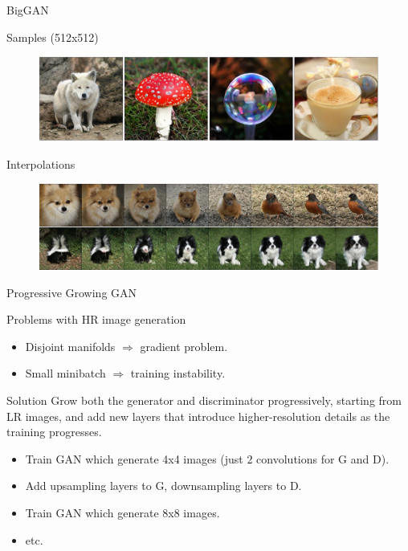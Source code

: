 \begin{frame}{BigGAN}
	\begin{block}{Samples (512x512)}
		\begin{figure}
			\centering
			\includegraphics[width=\linewidth]{figs/biggan_samples}
		\end{figure}
	\end{block}
	\vspace{-0.4cm}
	\begin{block}{Interpolations}
		\begin{figure}
			\centering
			\includegraphics[width=\linewidth]{figs/biggan_interpolations}
		\end{figure}
	\end{block}
\end{frame}
\begin{frame}{Progressive Growing GAN}
	\begin{block}{Problems with HR image generation}
		\begin{itemize}
			\item Disjoint manifolds $\Rightarrow$ gradient problem.
			\item Small minibatch $\Rightarrow$ training instability.
		\end{itemize}
	\end{block}
	\begin{block}{Solution}
		Grow both the generator and discriminator progressively, starting from LR images, and add new layers that introduce higher-resolution details as the training progresses. 
		\begin{itemize}
			\item Train GAN which generate 4x4 images (just 2 convolutions for G and D).
			\item Add upsampling layers to G, downsampling layers to D.
			\item Train GAN which generate 8x8 images.
			\item etc.
		\end{itemize}
	\end{block}
	
\end{frame}
